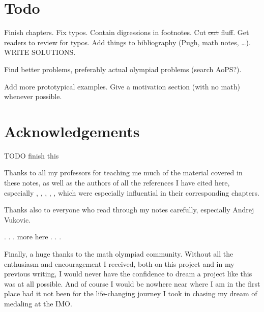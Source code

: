 \section*{Todo}
Finish chapters.
Fix typos.
Contain digressions in footnotes.
Cut \sout{out} fluff.
Get readers to review for typos.
Add things to bibliography (Pugh, math notes, \dots).
WRITE SOLUTIONS.

Find better problems, preferably actual olympiad problems (search AoPS?).

Add more prototypical examples.
Give a motivation section (with no math) whenever possible.

\section*{Acknowledgements}
TODO finish this

Thanks to all my professors for teaching me much of the
material covered in these notes,
as well as the authors of all the references I have cited here,
especially
\cite{ref:55a},
\cite{ref:msci},
\cite{ref:dartmouth},
\cite{ref:oggier_NT},
\cite{ref:manifolds},
which were especially influential in their corresponding chapters.


Thanks also to everyone who read through my notes carefully, especially Andrej Vukovic.

. . . more here . . .

Finally, a huge thanks to the math olympiad community.
Without all the enthusiasm and encouragement I received,
both on this project and in my previous writing,
I would never have the confidence to dream a project like this
was at all possible.
And of course I would be nowhere near where I am in the first place
had it not been for the life-changing journey I took
in chasing my dream of medaling at the IMO.
